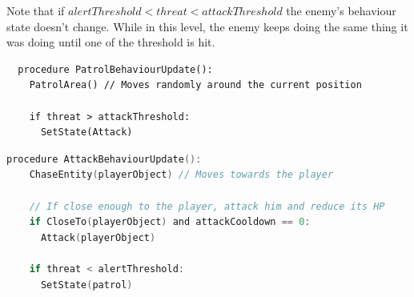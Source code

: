 \documentclass[11pt]{article}
\begin{document}
Note that if $alertThreshold < threat < attackThreshold$ the enemy's behaviour state doesn't change. While in this level, the enemy keeps doing the same thing it was doing until one of the threshold is hit.

\begin{lstlisting}
  procedure PatrolBehaviourUpdate():
    PatrolArea() // Moves randomly around the current position

    if threat > attackThreshold:
      SetState(Attack)
\end{lstlisting}

\begin{lstlisting}[language=C]
  procedure AttackBehaviourUpdate():
    ChaseEntity(playerObject) // Moves towards the player

    // If close enough to the player, attack him and reduce its HP
    if CloseTo(playerObject) and attackCooldown == 0: 
      Attack(playerObject)

    if threat < alertThreshold: 
      SetState(patrol)
\end{lstlisting}
\end{document}

